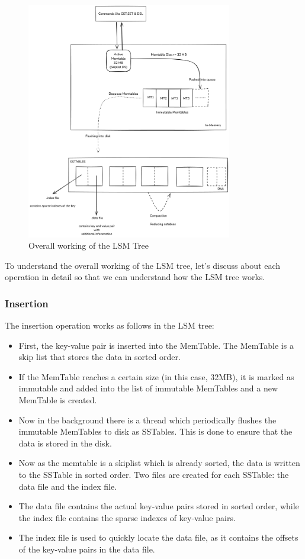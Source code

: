 \documentclass{article}
\begin{document}
\begin{figure}[H]
\centering
\includegraphics[width=0.8\textwidth]{./pictures/LSM Tree.png}
\caption{Overall working of the LSM Tree}
\label{fig:lsm_tree}
\end{figure}

To understand the overall working of the LSM tree, let's discuss about each operation in detail so that we can understand how the LSM tree works.

\subsubsection{Insertion}

\noindent The insertion operation works as follows in the LSM tree:
\begin{itemize}
    \item First, the key-value pair is inserted into the MemTable. The MemTable is a skip list that stores the data in sorted order.
    \item If the MemTable reaches a certain size (in this case, 32MB), it is marked as immutable and added into the list of immutable MemTables and a new MemTable is created.
    \item Now in the background there is a thread which periodically flushes the immutable MemTables to disk as SSTables. This is done to ensure that the data is stored in the disk.
    \item Now as the memtable is a skiplist which is already sorted, the data is written to the SSTable in sorted order. Two files are created for each SSTable: the data file and the index file.
    \item The data file contains the actual key-value pairs stored in sorted order, while the index file contains the sparse indexes of key-value pairs.
    \item The index file is used to quickly locate the data file, as it contains the offsets of the key-value pairs in the data file.
\end{itemize}
\end{document}
